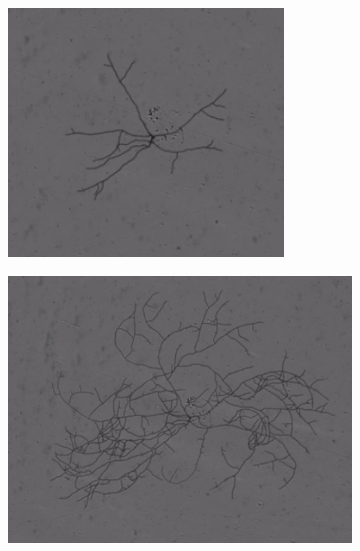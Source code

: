\documentclass[11pt]{article}
\theoremstyle{definition}
\begin{document}
\begin{figure}[hb]
\begin{subfigure}[b]{0.5\textwidth}
\includegraphics[width=\textwidth]{Images/2.png}
\end{subfigure}
\begin{subfigure}[b]{0.5\textwidth}
\includegraphics[width=\textwidth]{Images/3.png}
\end{subfigure}
\begin{subfigure}[b]{0.5\textwidth}

\end{subfigure}
\end{figure}
\end{document}
